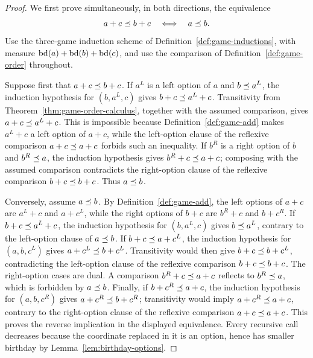 \begin{proof}
  \leanok
  We first prove simultaneously, in both directions, the equivalence
  \[
    a+c\preceq b+c\quad\Longleftrightarrow\quad a\preceq b.
  \]
  Use the three-game induction scheme of Definition~\ref{def:game-inductions}, with measure
  \(\operatorname{bd}(a)+\operatorname{bd}(b)+\operatorname{bd}(c)\), and use the comparison of
  Definition~\ref{def:game-order} throughout.

  Suppose first that \(a+c\preceq b+c\).  If \(a^L\) is a left option of
  \(a\) and \(b\preceq a^L\), the induction hypothesis for
  \((b,a^L,c)\) gives \(b+c\preceq a^L+c\).  Transitivity from
  Theorem~\ref{thm:game-order-calculus}, together with the assumed comparison,
  gives \(a+c\preceq a^L+c\).  This is impossible because
  Definition~\ref{def:game-add} makes \(a^L+c\) a left option of \(a+c\),
  while the left-option clause of the reflexive comparison
  \(a+c\preceq a+c\) forbids such an inequality.  If \(b^R\) is a right
  option of \(b\) and \(b^R\preceq a\), the induction hypothesis gives
  \(b^R+c\preceq a+c\); composing with the assumed comparison contradicts the
  right-option clause of the reflexive comparison \(b+c\preceq b+c\).  Thus
  \(a\preceq b\).

  Conversely, assume \(a\preceq b\).  By Definition~\ref{def:game-add}, the
  left options of \(a+c\) are \(a^L+c\) and \(a+c^L\), while the right
  options of \(b+c\) are \(b^R+c\) and \(b+c^R\).  If
  \(b+c\preceq a^L+c\), the induction hypothesis for \((b,a^L,c)\) gives
  \(b\preceq a^L\), contrary to the left-option clause of \(a\preceq b\).
  If \(b+c\preceq a+c^L\), the induction hypothesis for \((a,b,c^L)\)
  gives \(a+c^L\preceq b+c^L\).  Transitivity would then give
  \(b+c\preceq b+c^L\), contradicting the left-option clause of the reflexive
  comparison \(b+c\preceq b+c\).  The right-option cases are dual.  A
  comparison \(b^R+c\preceq a+c\) reflects to \(b^R\preceq a\), which is
  forbidden by \(a\preceq b\).  Finally, if
  \(b+c^R\preceq a+c\), the induction hypothesis for \((a,b,c^R)\) gives
  \(a+c^R\preceq b+c^R\); transitivity would imply
  \(a+c^R\preceq a+c\), contrary to the right-option clause of the reflexive
  comparison \(a+c\preceq a+c\).  This proves the reverse implication in the
  displayed equivalence.
  Every recursive call decreases because the coordinate replaced in it is an
  option, hence has smaller birthday by Lemma~\ref{lem:birthday-options}.


\end{proof}
